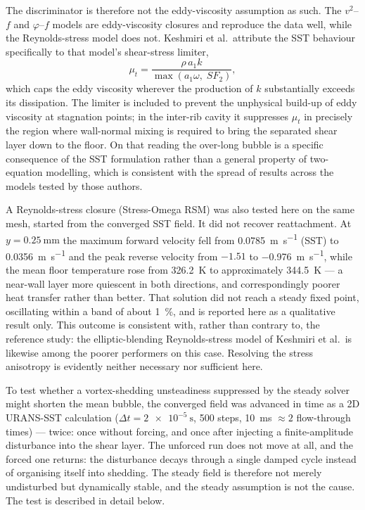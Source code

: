 \documentclass[11pt,a4paper]{article}
\begin{document}
\begin{description}
  The discriminator is therefore not the eddy-viscosity assumption as such.
  The $v^{2}$--$f$ and $\varphi$--$f$ models are eddy-viscosity closures and
  reproduce the data well, while the Reynolds-stress model does not. Keshmiri
  et al.\ attribute the SST behaviour specifically to that model's
  shear-stress limiter,
  \begin{equation*}
    \mu_t = \frac{\rho\, a_1 k}{\max\!\left(a_1\omega,\; S F_2\right)},
  \end{equation*}
  which caps the eddy viscosity wherever the production of $k$ substantially
  exceeds its dissipation. The limiter is included to prevent the unphysical
  build-up of eddy viscosity at stagnation points; in the inter-rib cavity it
  suppresses $\mu_t$ in precisely the region where wall-normal mixing is
  required to bring the separated shear layer down to the floor. On that
  reading the over-long bubble is a specific consequence of the SST
  formulation rather than a general property of two-equation modelling, which
  is consistent with the spread of results across the models tested by those
  authors.

  A Reynolds-stress closure (Stress-Omega RSM) was also tested here on the
  same mesh, started from the converged SST field. It did not recover
  reattachment. At $y = \SI{0.25}{\milli\meter}$ the maximum forward velocity
  fell from \SI{0.0785}{\meter\per\second} (SST) to
  \SI{0.0356}{\meter\per\second} and the peak reverse velocity from $-1.51$
  to \SI{-0.976}{\meter\per\second}, while the mean floor temperature rose
  from \SI{326.2}{\kelvin} to approximately \SI{344.5}{\kelvin} --- a
  near-wall layer more quiescent in both directions, and correspondingly
  poorer heat transfer rather than better. That solution did not reach a
  steady fixed point, oscillating within a band of about \SI{1}{\percent},
  and is reported here as a qualitative result only. This outcome is
  consistent with, rather than contrary to, the reference study: the
  elliptic-blending Reynolds-stress model of Keshmiri et al.\ is likewise
  among the poorer performers on this case. Resolving the stress anisotropy
  is evidently neither necessary nor sufficient here.

  \item[Steady-state assumption --- eliminated.] To test whether a
  vortex-shedding unsteadiness suppressed by the steady solver might shorten
  the mean bubble, the converged field was advanced in time as a 2D
  URANS-SST calculation ($\Delta t = \SI{2e-5}{\second}$, 500 steps,
  \SI{10}{\milli\second} $\approx 2$ flow-through times) --- twice: once
  without forcing, and once after injecting a finite-amplitude disturbance
  into the shear layer. The unforced run does not move at all, and the
  forced one returns: the disturbance decays through a single damped cycle
  instead of organising itself into shedding. The steady field is therefore
  not merely undisturbed but dynamically stable, and the steady assumption
  is not the cause. The test is described in detail below.


\end{description}
\end{document}
